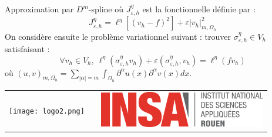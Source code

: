 \documentclass[final]{beamer}
\newlength{\onecolwid}
\begin{document}
\begin{frame}[t]
\begin{columns}[t]
\begin{column}{\onecolwid}
\begin{block}{Approximation par $D^m$-spline}
où $J_{\varepsilon, h}^\eta$ est la fonctionnelle définie par :
	\[J_{\varepsilon, h}^\eta=\ell^\eta \left[(v_h-f)^2\right]+\varepsilon |v_h|^2_{m,\Omega_h}\]
On considère ensuite le problème variationnel suivant : trouver $\sigma_{\varepsilon,h}^\eta\in V_h$ satisfaisant :
	\begin{equation} \label{eq13} \forall v_h\in V_h,\ \ell^\eta (\sigma_{\varepsilon, h}^\eta v_h)+ \varepsilon \left(\sigma_{\varepsilon, h}^\eta,v_h\right)=\ell^\eta(fv_h) \end{equation}
où $(u,v)_{m,\Omega_h}=\sum_{|\alpha|=m} \int_{\Omega_h} \partial^\alpha u(x) \partial^\alpha v(x) dx$.\\
\end{block}
\begin{center}
\begin{tabular}{ccc}
\texttt{[image: logo2.png]} & \hfill & \includegraphics[width=0.6\linewidth]{logo.png}
\end{tabular}
\end{center}
\end{column} %

\end{columns} %

\end{frame} %
\end{document}
